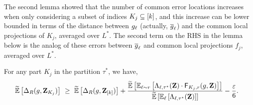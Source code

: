 	
	
	
	
	
	
%	

The second lemma showed that the number of common error locations increases when only considering a subset of indices $K_j \subseteq [k]$, and this increase can be lower bounded in terms of the distance between $g_{{ \ell }}$ (actually, $\overline{g}_{\ell}$) and the common local projections of $K_j$, averaged over $L^*$. The second term on the RHS in the lemma below is the analog of these errors between $\overline{g}_{\ell}$ and common local projections $f_j$, averaged over $L^*$.
	\begin{lemma}\label{lemma:more_common_errors}
	For any part $K_j$ in the partition $\tau^*$, we have,
	\begin{align*}
		\tildeEx{\Delta_R(g,\zee_{K_j})}
		~\geq~ \tildeEx{\Delta_R(g,\zee_{[k]})}  + \frac{\tildeEx{\Ex{\li \sim \ri}{\Lambda_{\li,\tau^*}(\zee) \cdot \fd_{K_j,\ri}(g,\zee)}}}{\tildeEx{\Ex{\li}{\Lambda_{\li,\tau^*}(\zee)}}} - \frac{\eps}{6} .
	\end{align*}
	\end{lemma}
	

